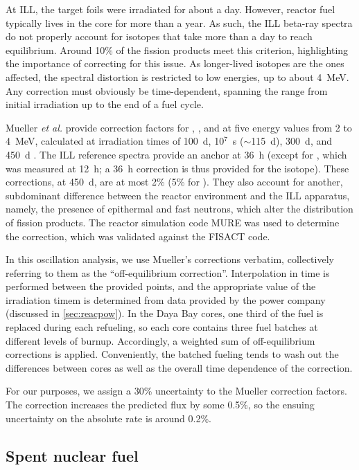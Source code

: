 \documentclass[../thesis.tex]{subfiles}
\begin{document}
At ILL, the target foils were irradiated for about a day. However, reactor fuel typically lives in the core for more than a year. As such, the ILL beta-ray spectra do not properly account for isotopes that take more than a day to reach equilibrium. Around 10\% of the fission products meet this criterion, highlighting the importance of correcting for this issue. As longer-lived isotopes are the ones affected, the spectral distortion is restricted to low energies, up to about 4~MeV. Any correction must obviously be time-dependent, spanning the range from initial irradiation up to the end of a fuel cycle.

Mueller \emph{et al.} provide correction factors for \urfive, \punine, and \puone at five energy values from 2 to 4~MeV, calculated at irradiation times of 100~d, 10$^7$~s ($\sim$115~d), 300~d, and 450~d \cite{PhysRevC.83.054615}. The ILL reference spectra provide an anchor at 36~h (except for \urfive, which was measured at 12~h; a 36~h correction is thus provided for the isotope). These corrections, at 450~d, are at most 2\% (5\% for \urfive). They also account for another, subdominant difference between the reactor environment and the ILL apparatus, namely, the presence of epithermal and fast neutrons, which alter the distribution of fission products. The reactor simulation code MURE was used to determine the correction, which was validated against the FISACT code.

In this oscillation analysis, we use Mueller's corrections verbatim, collectively referring to them as the ``off-equilibrium correction''. Interpolation in time is performed between the provided points, and the appropriate value of the irradiation timem is determined from data provided by the power company (discussed in \autoref{sec:reacpow}). In the Daya Bay cores, one third of the fuel is replaced during each refueling, so each core contains three fuel batches at different levels of burnup. Accordingly, a weighted sum of off-equilibrium corrections is applied. Conveniently, the batched fueling tends to wash out the differences between cores as well as the overall time dependence of the correction.

For our purposes, we assign a 30\% uncertainty to the Mueller correction factors. The correction increases the predicted flux by some 0.5\%, so the ensuing uncertainty on the absolute rate is around 0.2\%.

\subsection{Spent nuclear fuel}
\label{sec:snfcorr}
\end{document}
